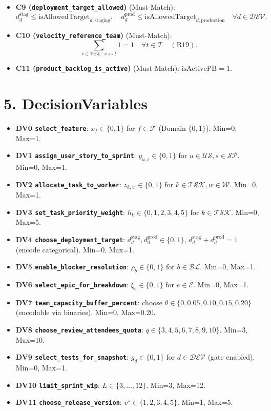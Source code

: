 \documentclass[11pt,a4paper]{article}
\begin{document}
\begin{itemize}[leftmargin=1.2em]
  \item \textbf{C9 (\texttt{deployment\_target\_allowed})} (Must-Match):
  \[
    d^{\text{stag}}_{d} \le \mathrm{isAllowedTarget}_{d,\text{staging}},\quad
    d^{\text{prod}}_{d} \le \mathrm{isAllowedTarget}_{d,\text{production}} \quad \forall d\in\mathcal{DEV}.
  \]

  \item \textbf{C10 (\texttt{velocity\_reference\_team})} (Must-Match):
  \[
    \sum_{v \in \mathcal{VEL}:\; v \leftrightarrow t} 1 = 1 \quad \forall t\in\mathcal{T} \quad (\text{R19}).
  \]

  \item \textbf{C11 (\texttt{product\_backlog\_is\_active})} (Must-Match): $\mathrm{isActivePB}=1$.
\end{itemize}

\section{5. DecisionVariables}
\begin{itemize}[leftmargin=1.2em]
  \item \textbf{DV0 \texttt{select\_feature}}: $x_f \in \{0,1\}$ for $f\in\mathcal{F}$ (Domain $\{0,1\}$). Min=0, Max=1.
  \item \textbf{DV1 \texttt{assign\_user\_story\_to\_sprint}}: $y_{u,s} \in \{0,1\}$ for $u\in\mathcal{US}, s\in\mathcal{SP}$. Min=0, Max=1.
  \item \textbf{DV2 \texttt{allocate\_task\_to\_worker}}: $z_{k,w} \in \{0,1\}$ for $k\in\mathcal{TSK}, w\in\mathcal{W}$. Min=0, Max=1.
  \item \textbf{DV3 \texttt{set\_task\_priority\_weight}}: $h_k \in \{0,1,2,3,4,5\}$ for $k\in\mathcal{TSK}$. Min=0, Max=5.
  \item \textbf{DV4 \texttt{choose\_deployment\_target}}: $d^{\text{stag}}_{d}, d^{\text{prod}}_{d}\in\{0,1\}$, $d^{\text{stag}}_{d}+d^{\text{prod}}_{d}=1$ (encode categorical). Min=0, Max=1.
  \item \textbf{DV5 \texttt{enable\_blocker\_resolution}}: $\rho_b \in \{0,1\}$ for $b\in\mathcal{BL}$. Min=0, Max=1.
  \item \textbf{DV6 \texttt{select\_epic\_for\_breakdown}}: $\xi_e \in \{0,1\}$ for $e\in\mathcal{E}$. Min=0, Max=1.
  \item \textbf{DV7 \texttt{team\_capacity\_buffer\_percent}}: choose $\theta \in \{0,0.05,0.10,0.15,0.20\}$ (encodable via binaries). Min=0, Max=0.20.
  \item \textbf{DV8 \texttt{choose\_review\_attendees\_quota}}: $q \in \{3,4,5,6,7,8,9,10\}$. Min=3, Max=10.
  \item \textbf{DV9 \texttt{select\_tests\_for\_snapshot}}: $g_d \in \{0,1\}$ for $d\in\mathcal{DEV}$ (gate enabled). Min=0, Max=1.
  \item \textbf{DV10 \texttt{limit\_sprint\_wip}}: $L \in \{3,\dots,12\}$. Min=3, Max=12.
  \item \textbf{DV11 \texttt{choose\_release\_version}}: $v^\star \in \{1,2,3,4,5\}$. Min=1, Max=5.
\end{itemize}
\end{document}
